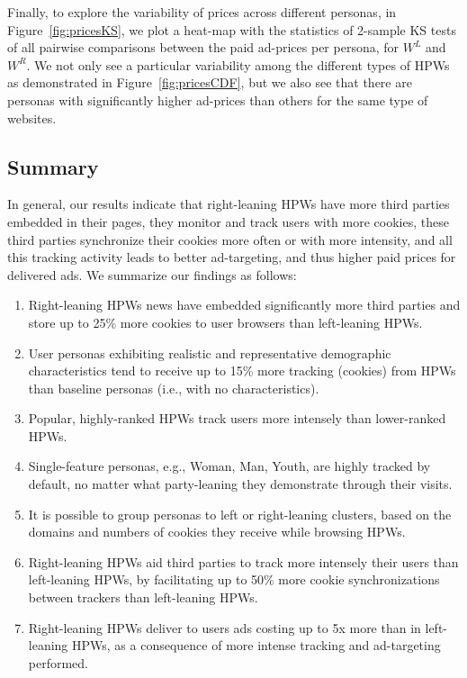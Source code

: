 \documentclass{article}
\newcommand{\hpws}{HPWs\xspace}
\begin{document}
Finally, to explore the variability of prices across different personas, in Figure~\ref{fig:pricesKS}, we plot a heat-map with the statistics of 2-sample KS tests of all pairwise comparisons between the paid ad-prices per persona, for $W^L$ and $W^R$.
We not only see a particular variability among the different types of \hpws as demonstrated in Figure~\ref{fig:pricesCDF}, but we also see that there are personas with significantly higher ad-prices than others for the same type of websites.

\subsection{Summary}
In general, our results indicate that right-leaning \hpws have more third parties embedded in their pages, they monitor and track users with more cookies, these third parties synchronize their cookies more often or with more intensity, and all this tracking activity leads to better ad-targeting, and thus higher paid prices for delivered ads.
We summarize our findings as follows:

\begin{enumerate}
    \item Right-leaning \hpws news have embedded significantly more third parties and store up to 25\% more cookies to user browsers than left-leaning \hpws.
    \item User personas exhibiting realistic and representative demographic characteristics tend to receive up to 15\% more tracking (cookies) from \hpws than baseline personas (i.e., with no characteristics).
    \item Popular, highly-ranked \hpws track users more intensely than lower-ranked \hpws.
    \item Single-feature personas, e.g., Woman, Man, Youth, are highly tracked by default, no matter what party-leaning they demonstrate through their visits.
    \item It is possible to group personas to left or right-leaning clusters, based on the domains and numbers of cookies they receive while browsing \hpws.
    \item Right-leaning \hpws aid third parties to track more intensely their users than left-leaning \hpws, by facilitating up to 50\% more cookie synchronizations between trackers than left-leaning \hpws.
    \item Right-leaning \hpws deliver to users ads costing up to 5x more than in left-leaning \hpws, as a consequence of more intense tracking and ad-targeting performed.
\end{enumerate}
\end{document}
